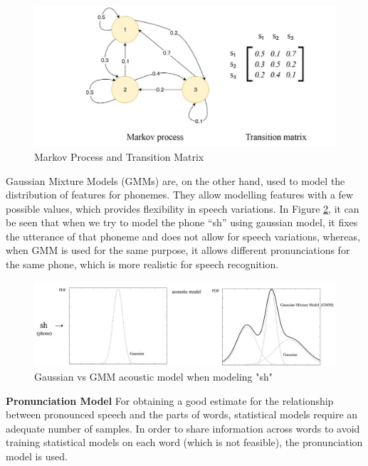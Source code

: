 \documentclass[
  a4paper,
]{article}
\begin{document}
\begin{figure}

{\centering \includegraphics{markov} 

}

\caption{Markov Process and Transition Matrix}\label{fig:markov}
\end{figure}

Gaussian Mixture Models (GMMs) are, on the other hand, used to model the
distribution of features for phonemes. They allow modelling features
with a few possible values, which provides flexibility in speech
variations. In Figure \ref{fig:gmm}, it can be seen that when we try to
model the phone ``sh'' using gaussian model, it fixes the utterance of
that phoneme and does not allow for speech variations, whereas, when GMM
is used for the same purpose, it allows different pronunciations for the
same phone, which is more realistic for speech recognition.

\begin{figure}

{\centering \includegraphics{gmm} 

}

\caption{Gaussian vs GMM acoustic model when modeling "sh"}\label{fig:gmm}
\end{figure}

\textbf{Pronunciation Model} For obtaining a good estimate for the
relationship between pronounced speech and the parts of words,
statistical models require an adequate number of samples. In order to
share information across words to avoid training statistical models on
each word (which is not feasible), the pronunciation model is used.
\end{document}
